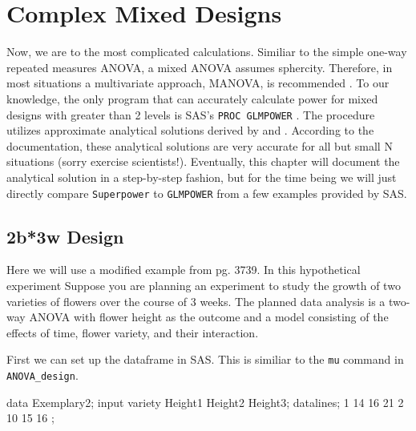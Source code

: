 \documentclass[
]{book}
\newenvironment{Shaded}{\begin{snugshade}}{\end{snugshade}}
\newcommand{\DecValTok}[1]{\textcolor[rgb]{0.00,0.00,0.81}{#1}}
\newcommand{\NormalTok}[1]{#1}
\begin{document}
\newpage

\hypertarget{complex-mixed-designs}{%
\section{Complex Mixed Designs}\label{complex-mixed-designs}}

Now, we are to the most complicated calculations. Similiar to the simple one-way repeated measures ANOVA, a mixed ANOVA assumes sphercity. Therefore, in most situations a multivariate approach, MANOVA, is recommended \citep{maxwell_designing_2004}. To our knowledge, the only program that can accurately calculate power for mixed designs with greater than 2 levels is SAS's \texttt{PROC\ GLMPOWER} \citep{SASglmpower}. The procedure utilizes approximate analytical solutions derived by \citet{muller1984practical} and \citet{o1999pragmatic}. According to the documentation, these analytical solutions are very accurate for all but small N situations (sorry exercise scientists!). Eventually, this chapter will document the analytical solution in a step-by-step fashion, but for the time being we will just directly compare \texttt{Superpower} to \texttt{GLMPOWER} from a few examples provided by SAS.

\hypertarget{b3w-design}{%
\subsection{2b*3w Design}\label{b3w-design}}

Here we will use a modified example from \citet{SASglmpower} pg. 3739. In this hypothetical experiment Suppose you are planning an experiment to study the growth of two varieties of flowers over the course of 3 weeks. The planned data analysis is a two-way ANOVA with flower height as the outcome and a model consisting of the effects of time, flower variety, and their interaction.

First we can set up the dataframe in SAS. This is similiar to the \texttt{mu} command in \texttt{ANOVA\_design}.

\begin{Shaded}
\begin{Highlighting}[]
\NormalTok{data Exemplary2;}
\NormalTok{input variety Height1 Height2 Height3;}
\NormalTok{datalines;}
\DecValTok{1} \DecValTok{14} \DecValTok{16} \DecValTok{21}
\DecValTok{2} \DecValTok{10} \DecValTok{15} \DecValTok{16}
\NormalTok{;}
\end{Highlighting}
\end{Shaded}
\end{document}
